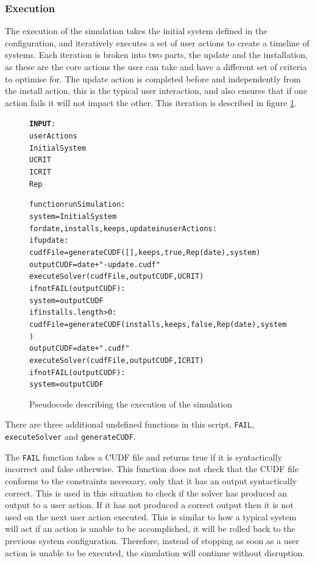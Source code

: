 \subsubsection{Execution}
The execution of the simulation takes the initial system defined in the configuration, and iteratively executes a set of user actions to create a timeline of systems.
Each iteration is broken into two parts, the update and the installation, as these are the core actions the user can take and have a different set of criteria to optimise for.
The update action is completed before and independently from the install action, this is the typical user interaction, and also ensures that if one action fails it will not impact the other.
This iteration is described in figure \ref{executeSimulation}.

\begin{figure}[htp]
\begin{center}
\begin{alltt}
\textbf{INPUT}:
userActions
InitialSystem
UCRIT
ICRIT
Rep

function runSimulation:
    system = InitialSystem
    for date,installs,keeps,update in userActions:
        if update:
            cudfFile = generateCUDF([],keeps,true,Rep(date),system)        
            outputCUDF  = date + "-update.cudf"
            executeSolver(cudfFile, outputCUDF, UCRIT)
            if not FAIL(outputCUDF):
                system = outputCUDF
        if installs.length > 0:
            cudfFile = generateCUDF(installs,keeps,false,Rep(date),system)        
            outputCUDF  = date + ".cudf"
            executeSolver(cudfFile, outputCUDF, ICRIT)
            if not FAIL(outputCUDF):
                system = outputCUDF
            
\end{alltt}
\caption[Execute Simulation]{Pseudocode describing the execution of the simulation}
\label{executeSimulation}
\end{center}
\end{figure}

There are three additional undefined functions in this script, \verb+FAIL+, \verb+executeSolver+ and \verb+generateCUDF+.

The \verb+FAIL+ function takes a CUDF file and returns true if it is syntactically incorrect and false otherwise.
This function does not check that the CUDF file conforms to the constraints necessary, only that it has an output syntactically correct.
This is used in this situation to check if the solver has produced an output to a user action.
If it has not produced a correct output then it is not used on the next user action executed. 
This is similar to how a typical system will act if an action is unable to be accomplished, it will be rolled back to the previous system configuration.
Therefore, instead of stopping as soon as a user action is unable to be executed, the simulation will continue without disruption.

